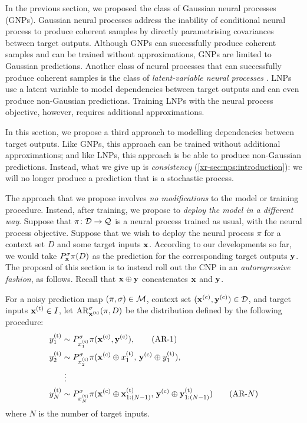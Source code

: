 \documentclass[12pt]{report}
\newcommand{\xrprefix}[1]{xr-#1}
\begin{document}
In the previous section, we proposed the class of Gaussian neural processes (GNPs).
Gaussian neural processes address the inability of conditional neural process to produce coherent samples by directly parametrising covariances between target outputs.
Although GNPs can successfully produce coherent samples
and can be trained without approximations,
GNPs are limited to Gaussian predictions.
Another class of neural processes that can successfully produce coherent samples is the class of \emph{latent-variable neural processes} \parencite[LNPs;][]{Garnelo:2018:Neural_Processes}.
LNPs use a latent variable to model dependencies between target outputs and can even produce non-Gaussian predictions.
Training LNPs with the neural process objective, however, requires additional approximations.

In this section, we propose a third approach to modelling dependencies between target outputs.
Like GNPs, this approach can be trained without additional approximations;
and like LNPs, this approach is be able to produce non-Gaussian predictions.
Instead, what we give up is \emph{consistency} (\cref{\xrprefix{sec:nps:introduction}}):
we will no longer produce a prediction that is a stochastic process.

The approach that we propose
involves \emph{no modifications} to the model or training procedure.
Instead, after training, we propose to \emph{deploy the model in a different way}.
Suppose that $\pi \colon \mathcal{D} \to \mathcal{Q}$ is a neural process trained as usual, with the neural process objective.
Suppose that we wish to deploy the neural process $\pi$ for a context set $D$ and some target inputs $\mathbf{x}$.
According to our developments so far, we would take $P^\sigma_{\mathbf{x}} \pi(D)$ as the prediction for the corresponding target outputs $\mathbf{y}$.
The proposal of this section is to instead roll out the CNP in an \emph{autoregressive fashion}, as follows.
Recall that $\mathbf{x} \oplus \mathbf{y}$ concatenates $\mathbf{x}$ and $\mathbf{y}$.

\begin{procedure}
    \label{proc:ar}
    For a noisy prediction map $(\pi, \sigma) \in \mathcal{M}$, context set $(\vx\us{(c)}, \vy\us{(c)}) \in \D$, and target inputs $\vx\us{(t)} \in I$,
    let $\AR^\sigma_{\vx\us{(t)}}(\pi, D)$ be the distribution defined by the following procedure:
    \begin{align}
        y\us{(t)}_1 &\sim P^\sigma_{x\us{(t)}_1} \pi(\vx\us{(c)}, \vy\us{(c)}), \label{eq:ar-1}  \tag{AR-1} \\
        y\us{(t)}_2 &\sim P^\sigma_{x\us{(t)}_2} \pi(\vx\us{(c)} \oplus x\us{(t)}_1,\, \vy\us{(c)} \oplus y\us{(t)}_1), \nonumber \\
            &\;\vdots \nonumber \\
        y\us{(t)}_N &\sim P^\sigma_{x\us{(t)}_N} \pi(\vx\us{(c)} \oplus \vx\us{(t)}_{1:(N-1)},\,\vy\us{(c)} \oplus \vy\us{(t)}_{1:(N-1)})  \label{eq:ar-N} \tag{AR-$N$}
    \end{align}
    where $N$ is the number of target inputs.
\end{procedure}
\end{document}
